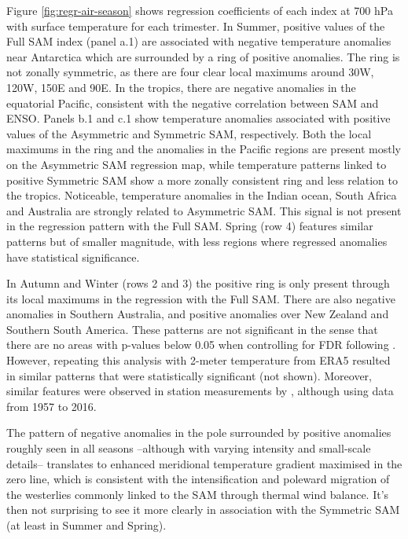 \documentclass[]{ametsocV5}
\begin{document}
Figure \ref{fig:regr-air-season} shows regression coefficients of each
index at 700 hPa with surface temperature for each trimester. In Summer,
positive values of the Full SAM index (panel a.1) are associated with
negative temperature anomalies near Antarctica which are surrounded by a
ring of positive anomalies. The ring is not zonally symmetric, as there
are four clear local maximums around 30\degree W, 120\degree W,
150\degree E and 90\degree E. In the tropics, there are negative
anomalies in the equatorial Pacific, consistent with the negative
correlation between SAM and ENSO. Panels b.1 and c.1 show temperature
anomalies associated with positive values of the Asymmetric and
Symmetric SAM, respectively. Both the local maximums in the ring and the
anomalies in the Pacific regions are present mostly on the Asymmetric
SAM regression map, while temperature patterns linked to positive
Symmetric SAM show a more zonally consistent ring and less relation to
the tropics. Noticeable, temperature anomalies in the Indian ocean,
South Africa and Australia are strongly related to Asymmetric SAM. This
signal is not present in the regression pattern with the Full SAM.
Spring (row 4) features similar patterns but of smaller magnitude, with
less regions where regressed anomalies have statistical significance.

In Autumn and Winter (rows 2 and 3) the positive ring is only present
through its local maximums in the regression with the Full SAM. There
are also negative anomalies in Southern Australia, and positive
anomalies over New Zealand and Southern South America. These patterns
are not significant in the sense that there are no areas with p-values
below 0.05 when controlling for FDR following \citet{wilks2016}.
However, repeating this analysis with 2-meter temperature from ERA5
resulted in similar patterns that were statistically significant (not
shown). Moreover, similar features were observed in station measurements
by \citet{jones2019}, although using data from 1957 to 2016.

The pattern of negative anomalies in the pole surrounded by positive
anomalies roughly seen in all seasons --although with varying intensity
and small-scale details-- translates to enhanced meridional temperature
gradient maximised in the zero line, which is consistent with the
intensification and poleward migration of the westerlies commonly linked
to the SAM through thermal wind balance. It's then not surprising to see
it more clearly in association with the Symmetric SAM (at least in
Summer and Spring).
\end{document}
